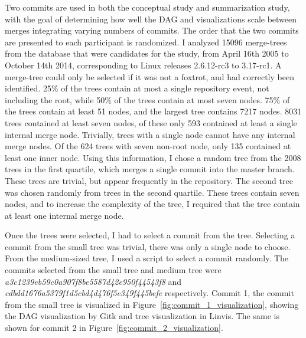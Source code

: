 Two commits are used in both the conceptual study and summarization
study, with the goal of determining how well the DAG and \mt{}
visualizations scale between merges integrating varying numbers of
commits. The order that the two commits are presented to each
participant is randomized. I analyzed 15096 merge-trees from the
database that were candidates for the study, from April 16th 2005 to
October 14th 2014, corresponding to Linux releases 2.6.12-rc3 to
3.17-rc1. A merge-tree could only be selected if it was not a foxtrot,
and had correctly been identified. 25\% of the trees contain at most a
single repository event, not including the root, while 50\% of the trees
contain at most seven nodes. 75\% of the trees contain at least 51
nodes, and the largest tree contains 7217 nodes. 8031 trees contained at
least seven nodes, of these only 593 contained at least a single
internal merge node. Trivially, trees with a single node cannot have any
internal merge nodes. Of the 624 trees with seven non-root node, only
135 contained at least one inner node. Using this information, I chose a
random tree from the 2008 trees in the first quartile, which merges a
single commit into the master branch. These trees are trivial, but
appear frequently in the repository. The second tree was chosen randomly
from trees in the second quartile. These trees contain seven nodes, and
to increase the complexity of the tree, I required that the tree contain
at least one internal merge node.

Once the trees were selected, I had to select a commit from the tree.
Selecting a commit from the small tree was trivial, there was only a
single node to choose. From the medium-sized tree, I used a script to
select a commit randomly. The commits selected from the small tree and
medium tree were \emph{a3c1239eb59c0a907f8be5587d42e950f44543f8} and
\emph{cdbdd1676a5379f1d5cbd4d476f5e349f445befe} respectively. Commit 1,
the commit from the small tree is visualized in
Figure~\ref{fig:commit_1_visualization}, showing the DAG visualization
by Gitk and \rt{} tree visualization in Linvis. The same is
shown for commit 2 in Figure~\ref{fig:commit_2_visualization}.

